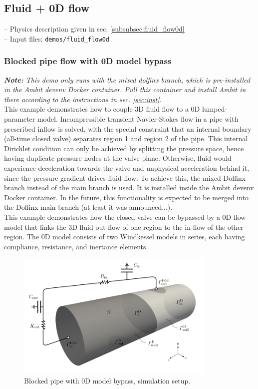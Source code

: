 \documentclass[a4paper,12pt]{report}
\begin{document}
\subsection{Fluid + 0D flow}\label{subsec:demos:fluid_flow0d}

-- Physics description given in sec. \ref{subsubsec:fluid_flow0d}\\

-- Input files: \verb"demos/fluid_flow0d"

\subsubsection*{Blocked pipe flow with 0D model bypass}

\textit{\textbf{Note:} This demo only runs with the mixed dolfinx branch, which is pre-installed in the Ambit devenv Docker container. Pull this container and install Ambit in there according to the instructions in sec. \ref{sec:inst}.}\\

This example demonstrates how to couple 3D fluid flow to a 0D lumped-parameter model. Incompressible transient Navier-Stokes flow in a pipe with prescribed inflow is solved,
with the special constraint that an internal boundary (all-time closed valve) separates region 1 and region 2 of the pipe. This internal Dirichlet condition can only be achieved
by splitting the pressure space, hence having duplicate pressure nodes at the valve plane. Otherwise, fluid would experience deceleration towards the valve and unphysical acceleration behind it, since the pressure gradient drives fluid flow. To achieve this, the mixed Dolfinx branch instead of the main branch is used. It is installed inside the Ambit devenv Docker
container. In the future, this functionality is expected to be merged into the Dolfinx main branch (at least it was announced...).\\

This example demonstrates how the closed valve can be bypassed by a 0D flow model that links the 3D fluid out-flow of one region to the in-flow of the other region. The 0D model consists of two Windkessel models in series, each having compliance, resistance, and inertance elements.

\begin{figure}
\centering
\includegraphics[width=0.85\textwidth]{fig/pipe_0d_setup.png}
\caption{Blocked pipe with 0D model bypass, simulation setup.}
\label{fig:pipe_0d_setup}
\end{figure}
\end{document}
